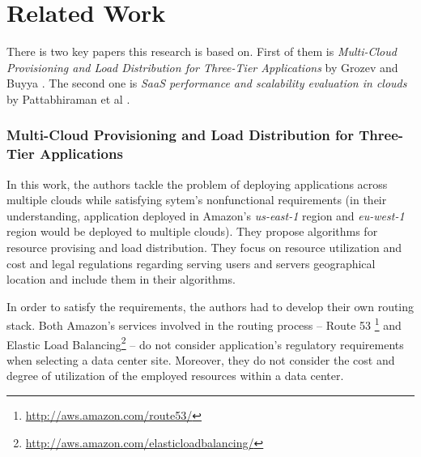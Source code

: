 \documentclass{uvamscse}
\begin{document}
\section{Related Work}\label{Related Work}

There is two key papers this research is based on. First of them is \textit{Multi-Cloud Provisioning and Load Distribution for Three-Tier Applications} by Grozev and Buyya \cite{GroBuy}. The second one is \textit{SaaS performance and scalability evaluation in clouds} by Pattabhiraman et al \cite{Models}.

\subsubsection{Multi-Cloud Provisioning and Load Distribution for Three-Tier Applications}

In this work, the authors tackle the problem of deploying applications across multiple clouds while satisfying sytem's nonfunctional requirements (in their understanding, application deployed in Amazon's \textit{us-east-1} region and \textit{eu-west-1} region would be deployed to multiple clouds). They propose algorithms for resource provising and load distribution. They focus on resource utilization and cost and legal regulations regarding serving users and servers geographical location and include them in their algorithms.

In order to satisfy the requirements, the authors had to develop their own routing stack. Both Amazon's services involved in the routing process -- Route 53 \footnote{\url{http://aws.amazon.com/route53/}} and Elastic Load Balancing\footnote{\url{http://aws.amazon.com/elasticloadbalancing/}} -- do not consider application's regulatory requirements when selecting a data center site. Moreover, they do not consider the cost and degree of utilization of the employed resources within a data center.
\end{document}
